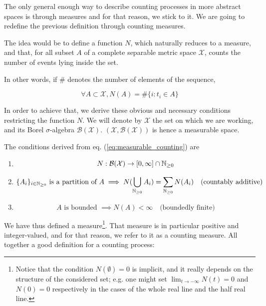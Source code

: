 \documentclass[11pt]{book}
\newcommand{\sequence}[1]{\{ #1 \}_{ i \in \N} }
\begin{document}
The only general enough way to describe counting processes in more abstract spaces is through measures and for that reason, we stick to it. We are going to redefine the previous definition through counting measures.

The idea would be to define a function $N$, which naturally reduces to a measure, and that, for all subset $A$ of a complete separable metric space $\mathcal X$, counts the number of events lying inside the set.

In other words, if $\#$ denotes the number of elements of the sequence,

\begin{equation}
\forall A \subset \mathcal X, N(A) = \# \{ i: t_i \in A \}
\label{eq:measurable_counting}
\end{equation}

In order to achieve that, we derive these obvious and necessary conditions restricting the function $N$. We will denote by $\mathcal X$ the set on which we are working, and its Borel $\sigma$-algebra $\mathcal B( \mathcal X )$. $( \mathcal X, \mathcal B( \mathcal X ) )$ is hence a measurable space.

The conditions derived from eq. (\ref{eq:measurable_counting}) are
\begin{enumerate}
\setlength{\itemindent}{1 cm}
\item  
\begin{equation}
N : \mathcal B( \mathcal X ) \to [0, \infty ] \cap \mathbb{N}_{\geq 0}
\end{equation}
\item 
\begin{equation}
\sequence{A_i} \text{ is a partition of } A \implies N( \bigcup_{\N} A_i ) = \sum_{\N} N(A_i)  \quad \text{(countably additive)}
\end{equation}
\item 
\begin{equation}
A \text{ is bounded } \implies N(A) < \infty  \quad \text{(boundedly finite)}
\end{equation}
\end{enumerate}

We have thus defined a measure\footnote{Notice that the condition $N( \emptyset ) = 0$ is implicit, and it really depends on the structure of the considered set; e.g. one might set $\lim_{t\to -\infty} N(t) = 0$ and $N(0) = 0$ respectively in the cases of the whole real line and the half real line.}. That measure is in particular positive and integer-valued, and for that reason, we refer to it as a counting measure. All together a good definition for a counting process:
\end{document}
